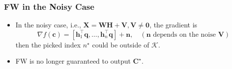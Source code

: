 \documentclass[10pt,xcolor={usenames,dvipsnames,table}]{beamer}
\newcommand{\T}{\!\top\!}
\begin{document}
\begin{frame}
    \frametitle{FW in the Noisy Case}
        
    \begin{itemize}
        \item In the noisy case, i.e., $\bm{X} = \bm{W}\bm{H} + \bm{V}, \bm{V} \neq \bm{0}$,
  the gradient is
  \[
      \nabla f(\bm{c}) = [\bm{h}_1^{\T}\bm{q}, \ldots , \bm{h}_n^{\T}\bm{q}] + \bm{n}, \quad ( \bm{n} \text{ depends on the noise $\bm{V}$})
  \] 
  then the picked index $n^{\star}$ could be outside of $\mathcal{K}$.
\item FW is no longer guaranteed to output $\bm{C}^{\star}$.
    \end{itemize}


\end{frame}
\end{document}
